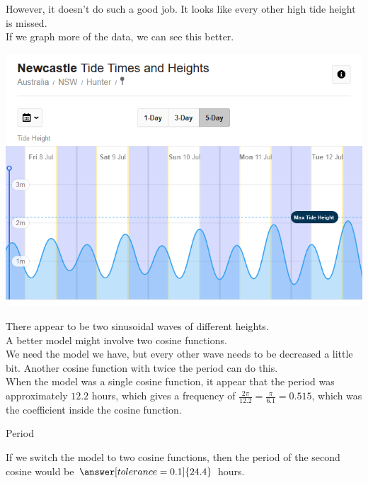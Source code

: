 \documentclass{ximera}
\begin{document}
However, it doesn't do such a good job. It looks like every other high tide height is missed.\\


If we graph more of the data, we can see this better.





\begin{image}
\includegraphics{pics/tides2.png}
\end{image}



There appear to be two sinusoidal waves of different heights.  \\

A better model might involve two cosine functions. \\


We need the model we have, but every other wave needs to be decreased a little bit.  Another cosine function with twice the period can do this. \\



When the model was a single cosine function, it appear that the period was approximately $12.2$ hours, which gives a frequency of $\frac{2 \pi}{12.2} = \frac{\pi}{6.1} = 0.515$, which was the coefficient inside the cosine function.  



\begin{question}  Period

If we switch the model to two cosine functions, then the period of the second cosine would be $\answer[tolerance=0.1]{24.4}$ hours.


\end{question}
\end{document}
